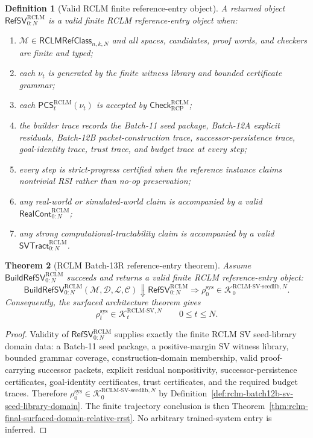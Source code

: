 \documentclass[11pt,a4paper]{article}
\newtheorem{theorem}{Theorem}[section]
\newtheorem{definition}[theorem]{Definition}
\newcommand{\Kcal}{\mathcal K}
\newcommand{\RCP}{\mathrm{RCP}}
\newcommand{\RCLM}{\mathrm{RCLM}}
\newcommand{\sys}{\mathrm{sys}}
\begin{document}
\begin{definition}[Valid RCLM finite reference-entry object]
\label{def:rclm-batch13r-valid-refsv}
A returned object \(\mathsf{RefSV}_{0:N}^{\RCLM}\) is a valid finite RCLM reference-entry object when:
\begin{enumerate}[label=(\roman*),leftmargin=1.5em]
    \item \(\mathcal M\in\mathsf{RCLMRefClass}_{n,k,N}\) and all spaces, candidates, proof words, and checkers are finite and typed;
    \item each \(\nu_t\) is generated by the finite witness library and bounded certificate grammar;
    \item each \(\mathsf{PCS}_t^{\RCLM}(\nu_t)\) is accepted by \(\mathsf{Check}_{\RCP}^{\RCLM}\);
    \item the builder trace records the Batch-11 seed package, Batch-12A explicit residuals, Batch-12B packet-construction trace, successor-persistence trace, goal-identity trace, trust trace, and budget trace at every step;
    \item every step is strict-progress certified when the reference instance claims nontrivial RSI rather than no-op preservation;
    \item any real-world or simulated-world claim is accompanied by a valid \(\mathsf{RealCont}_{0:N}^{\RCLM}\);
    \item any strong computational-tractability claim is accompanied by a valid \(\mathsf{SVTract}_{0:N}^{\RCLM}\).
\end{enumerate}
\end{definition}

\begin{theorem}[RCLM Batch-13R reference-entry theorem]
\label{thm:rclm-batch13r-reference-entry}
Assume \(\mathsf{BuildRefSV}_{0:N}^{\RCLM}\) succeeds and returns a valid finite RCLM reference-entry object:
\[
\boxed{
\mathsf{BuildRefSV}_{0:N}^{\RCLM}(\mathcal M,\mathcal D,\mathcal L,\mathcal C)
\Downarrow
\mathsf{RefSV}_{0:N}^{\RCLM}
\Longrightarrow
\rho_0^{\sys}
\in
\Kcal_0^{\RCLM\text{-}\mathrm{SV\mbox{-}seedlib},N}.
}
\]
Consequently, the surfaced architecture theorem gives
\[
\rho_t^{\sys}
\in
\Kcal_t^{\RCLM\text{-}\mathrm{SV},N}
\qquad
0\le t\le N.
\]
\end{theorem}

\begin{proof}
Validity of \(\mathsf{RefSV}_{0:N}^{\RCLM}\) supplies exactly the finite RCLM SV seed-library domain data: a Batch-11 seed package, a positive-margin SV witness library, bounded grammar coverage, construction-domain membership, valid proof-carrying successor packets, explicit residual nonpositivity, successor-persistence certificates, goal-identity certificates, trust certificates, and the required budget traces.  Therefore \(\rho_0^{\sys}\in\Kcal_0^{\RCLM\text{-}\mathrm{SV\mbox{-}seedlib},N}\) by Definition~\ref{def:rclm-batch12b-sv-seed-library-domain}.  The finite trajectory conclusion is then Theorem~\ref{thm:rclm-final-surfaced-domain-relative-rrst}.  No arbitrary trained-system entry is inferred.
\end{proof}
\end{document}
